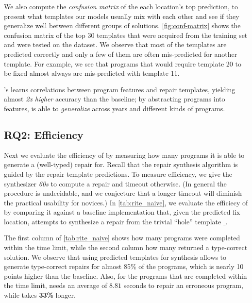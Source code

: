 %
We also compute the \emph{confusion matrix} of the each location's 
top prediction, to present what templates our models usually mix 
with each other and see if they generalize well between different 
groups of solutions. 
%
\autoref{fig:conf-matrix} shows the confusion matrix of the 
top 30 templates that were acquired from the training set 
and were tested on the \FALL dataset.
%
We observe that most of the templates are predicted correctly 
and only a few of them are often mis-predicted for another template. 
%
For example, we see that programs that would require template 20 
to be fixed almost always are mis-predicted with template 11.


\begin{framed}
  \noindent \toolname's learns correlations between program features and repair 
  templates, yielding almost \emph{2x higher} accuracy than the baseline;
  by abstracting programs into features, \toolname is able 
  to \emph{generalize} across years and different kinds of programs.
\end{framed}


\subsection{RQ2: Efficiency}
\label{sec:eval:efficiency}
\label{subsec:eval:man_rep_qual_eval}

Next we evaluate the efficiency of \toolname by measuring how many 
programs it is able to generate a (well-typed) repair for.
%
Recall that the repair synthesis algorithm is guided by the 
repair template predictions.
%
To measure efficiency, we give the synthesizer \emph{60s} to 
compute a repair and timeout otherwise. (In general the procedure 
is undecidable, and we conjecture that a longer timeout will diminish 
the practical usability for novices.)
%
In \autoref{tab:rite_naive}, we evaluate the efficiecy of \toolname
by comparing it against a baseline \naive implementation that, given 
the predicted fix location, attempts to synthesize a repair from the 
trivial ``hole'' template $\_$.

The first column of \autoref{tab:rite_naive} shows how many 
programs were completed within the time limit, while the second 
column how many returned a type-correct solution. 
%
We observe that using predicted templates for synthesis allows 
\toolname to generate type-correct repairs for almost 85\% of 
the programs, which is nearly 10 points higher than the \naive 
baseline. Also, for the programs that are completed within 
the time limit, \toolname needs an average of $8.81$ seconds 
to repair an erroneous program, while \naive takes 
\textbf{33\%} longer.

